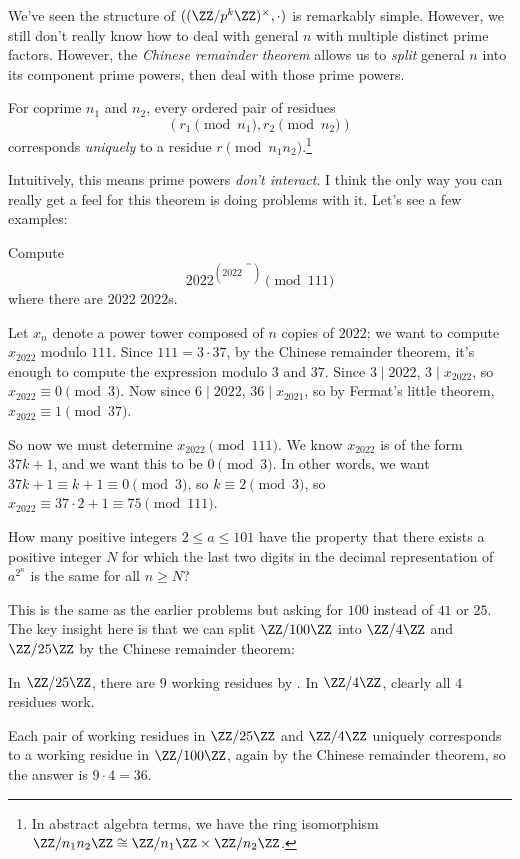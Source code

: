 \documentclass[11pt]{scrartcl}
\begin{document}
We've seen the structure of $((\ZZ/p^k\ZZ)^\times,\cdot)$ is remarkably simple. However, we still don't really know how to deal with general $n$ with multiple distinct prime factors. However, the \emph{Chinese remainder theorem} allows us to \emph{split} general $n$ into its component prime powers, then deal with those prime powers.
\begin{theorem}
	For coprime $n_1$ and $n_2$, every ordered pair of residues
	\[(r_1 \pmod{n_1},r_2 \pmod{n_2})\]
	corresponds \emph{uniquely} to a residue $r \pmod{n_1n_2}$.\footnote{In abstract algebra terms, we have the ring isomorphism $\ZZ/n_1n_2\ZZ \cong \ZZ/n_1\ZZ \times \ZZ/n_2\ZZ$.}
\end{theorem}

Intuitively, this means prime powers \emph{don't interact}. I think the only way you can really get a feel for this theorem is doing problems with it. Let's see a few examples:

\begin{example}[CMIMC 2023/A3]
	Compute
	\[2022^{\left(2022^{\cdot^{\cdot^{\cdot^{2022}}}}\right)} \pmod{111}\]
	where there are $2022$ $2022$s.
\end{example}

Let $x_n$ denote a power tower composed of $n$ copies of $2022$; we want to compute $x_{2022}$ modulo $111$. Since $111 = 3 \cdot 37$, by the Chinese remainder theorem, it's enough to compute the expression modulo $3$ and $37$. Since $3 \mid 2022$, $3 \mid x_{2022}$, so $x_{2022} \equiv 0 \pmod{3}$. Now since $6 \mid 2022$, $36 \mid x_{2021}$, so by Fermat's little theorem, $x_{2022} \equiv 1 \pmod{37}$.

So now we must determine $x_{2022} \pmod{111}$. We know $x_{2022}$ is of the form $37k + 1$, and we want this to be $0 \pmod{3}$. In other words, we want $37k + 1 \equiv k + 1 \equiv 0 \pmod{3}$, so $k \equiv 2 \pmod{3}$, so $x_{2022} \equiv 37 \cdot 2 + 1 \equiv 75 \pmod{111}$.

\begin{example}
	How many positive integers $2 \le a \le 101$ have the property that there exists a positive integer $N$ for which the last two digits in the decimal representation of $a^{2^n}$ is the same for all $n \ge N$?
\end{example}

This is the same as the earlier problems but asking for $100$ instead of $41$ or $25$. The key insight here is that we can split $\ZZ/100\ZZ$ into $\ZZ/4\ZZ$ and $\ZZ/25\ZZ$ by the Chinese remainder theorem:
\begin{itemize}
	\ii In $\ZZ/25\ZZ$, there are $9$ working residues by .
	\ii In $\ZZ/4\ZZ$, clearly all $4$ residues work.
\end{itemize}
Each pair of working residues in $\ZZ/25\ZZ$ and $\ZZ/4\ZZ$ uniquely corresponds to a working residue in $\ZZ/100\ZZ$, again by the Chinese remainder theorem, so the answer is $9 \cdot 4 = 36$.
\end{document}

